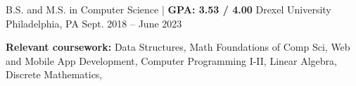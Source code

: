 

\begin{cventries}

  \cventry
  {B.S. and M.S. in Computer Science | \textbf{ GPA: 3.53 / 4.00}} %
  {Drexel University} %
  {Philadelphia, PA} %
  {Sept. 2018 -- June 2023} %
  {
    \begin{cvitems} %
      \item {\color{darktext} \textbf{Relevant coursework:}}
      Data Structures,
      Math Foundations of Comp Sci,
      Web and Mobile App Development,
      Computer Programming I-II,
      Linear Algebra,
      Discrete Mathematics,
    \end{cvitems}
  }

\end{cventries}
